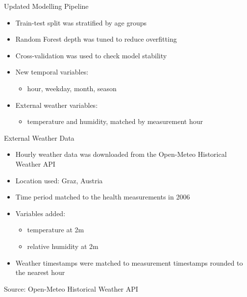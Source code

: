 \begin{frame}{Updated Modelling Pipeline}

\begin{itemize}
    \item Train-test split was stratified by age groups
    \item Random Forest depth was tuned to reduce overfitting
    \item Cross-validation was used to check model stability
    \item New temporal variables:
    \begin{itemize}
        \item hour, weekday, month, season
    \end{itemize}
    \item External weather variables:
    \begin{itemize}
        \item temperature and humidity, matched by measurement hour
    \end{itemize}
\end{itemize}

\end{frame}
\begin{frame}{External Weather Data}

\begin{itemize}
    \item Hourly weather data was downloaded from the Open-Meteo Historical Weather API
    \item Location used: Graz, Austria
    \item Time period matched to the health measurements in 2006
    \item Variables added:
    \begin{itemize}
        \item temperature at 2m
        \item relative humidity at 2m
    \end{itemize}
    \item Weather timestamps were matched to measurement timestamps rounded to the nearest hour
\end{itemize}

\vspace{0.2cm}

\small
Source: Open-Meteo Historical Weather API

\end{frame}

